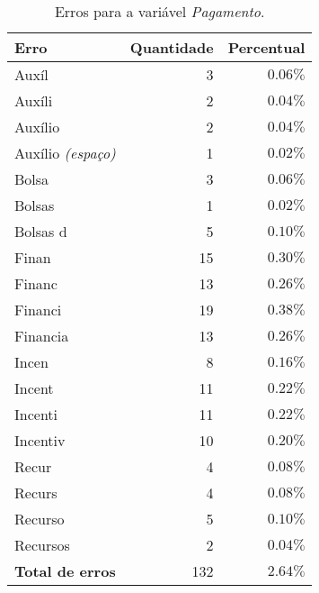 \documentclass[10pt,a4paper,oneside]{article}
\begin{document}
\begin{table}[!h]
\centering
\caption{Erros para a variável \textit{Pagamento}.}
\vspace{0.5em}
\label{table: erros-pagamento}
\begin{tabular}{l r r}
	\toprule
	\textbf{Erro} & \textbf{Quantidade}  & \textbf{Percentual} \\
	\midrule
	Auxíl     		& 3   & $0.06\%$ \\
	Auxíli 	  		& 2   & $0.04\%$ \\
	Auxílio    	 	& 2   & $0.04\%$ \\
	Auxílio \textit{(espaço)}   	& 1   & $0.02\%$ \\
	Bolsa      	 	& 3   & $0.06\%$ \\
	Bolsas     	 	& 1   & $0.02\%$ \\
	Bolsas d   	 	& 5   & $0.10\%$ \\
	Finan      	 	& 15  & $0.30\%$ \\
	Financ     	 	& 13  & $0.26\%$ \\
	Financi    	 	& 19  & $0.38\%$ \\
	Financia   	 	& 13  & $0.26\%$ \\
	Incen      	 	& 8   & $0.16\%$ \\
	Incent     	 	& 11  & $0.22\%$ \\
	Incenti    	 	& 11  & $0.22\%$ \\
	Incentiv   	 	& 10  & $0.20\%$ \\
	Recur      	 	& 4   & $0.08\%$ \\
	Recurs     	 	& 4   & $0.08\%$ \\
	Recurso    	 	& 5   & $0.10\%$ \\
	Recursos   	 	& 2   & $0.04\%$ \\	
	\midrule
	\textbf{Total de erros}  & 132  & $2.64\%$ \\	
	\bottomrule
\end{tabular}
\end{table}
\end{document}
